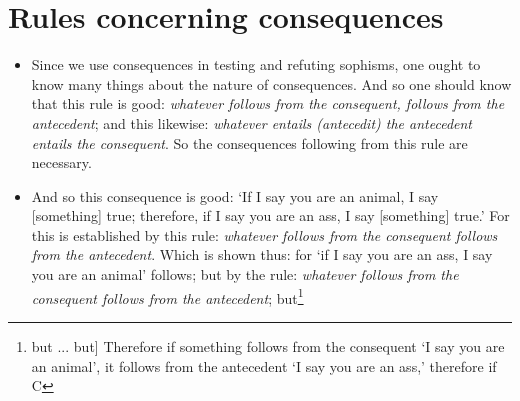 \documentclass[]{article}
\begin{document}
\section{Rules concerning consequences}
\begin{itemize}
\item[1.] Since we use consequences in testing and refuting sophisms, one ought to know many things about the nature of consequences. And so one should know that this rule is good: \textit{whatever follows from the consequent, follows from the antecedent}; and this likewise: \textit{whatever entails (antecedit) the antecedent entails the consequent}. So the consequences following from this rule are necessary.
\item[2.] And so this consequence is good: `If I say you are an animal, I say [something] true; therefore, if I say you are an ass, I say [something] true.' For this is established by this rule: \textit{whatever follows from the consequent follows from the antecedent}. Which is shown thus: for `if I say you are an ass, I say you are an animal' follows; but by the rule: \textit{whatever follows from the consequent follows from the antecedent}; but\footnote{but ... but] Therefore if something follows from the consequent `I say you are an animal', it follows from the antecedent `I say you are an ass,' therefore if C
	
}
\end{itemize}
\end{document}
